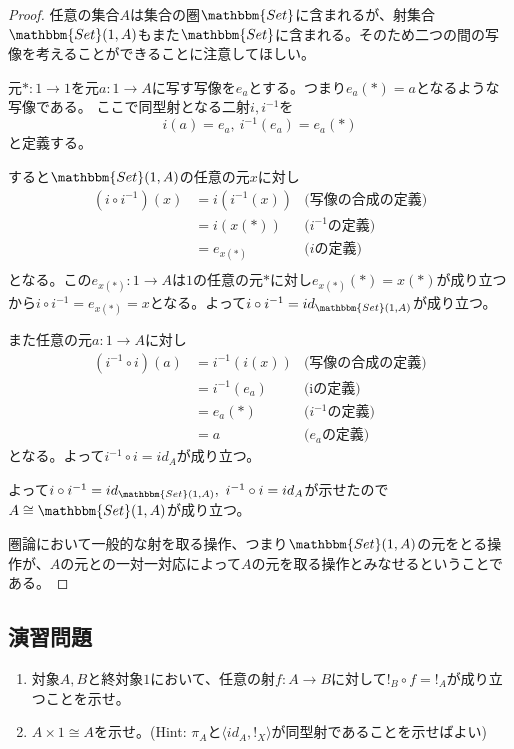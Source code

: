 \documentclass[dvipdfmx]{jsarticle}
\newcommand{\cat}[1]{\mathbbm{#1}}
\newcommand{\arrow}{\rightarrow}
\newcommand{\tuple}[1]{\langle #1\rangle}
\newcommand{\mor}[3]{#1:#2\arrow #3}
\newcommand{\arset}[3]{\cat{#1}(#2,#3)}
\newtheorem{proof}{証明}[section]
\numberwithin{proof}{subsection}
\numberwithin{prop}{subsection}
\numberwithin{define}{subsection}
\begin{document}
	\begin{proof}
		任意の集合$A$は集合の圏$\cat{Set}$に含まれるが、射集合$\arset{Set}{1}{A}$もまた$\cat{Set}$に含まれる。そのため二つの間の写像を考えることができることに注意してほしい。

		元$\mor{*}{1}{1}$を元$\mor{a}{1}{A}$に写す写像を$e_a$とする。つまり$e_a(*)=a$となるような写像である。
		ここで同型射となる二射$i,i^{-1}$を\[i(a)=e_a,\ i^{-1}(e_a)=e_a(*)\]と定義する。
		\begin{center}
		\end{center}
		すると$\arset{Set}{1}{A}$の任意の元$x$に対し
			\begin{align*}
				(i\circ i^{-1})(x)&=i(i^{-1}(x))&\text{(写像の合成の定義)}\\
				&=i(x(*))&\text{($i^{-1}$の定義)}\\
				&=e_{x(*)}&\text{($i$の定義)}\\
			\end{align*}
		となる。この$\mor{e_{x(*)}}{1}{A}$は$1$の任意の元$*$に対し$e_{x(*)}(*)=x(*)$が成り立つから$i\circ i^{-1}=e_{x(*)}=x$となる。よって$i\circ i^{-1}=id_{\arset{Set}{1}{A}}$が成り立つ。

		また任意の元$\mor{a}{1}{A}$に対し
		\begin{align*}
			(i^{-1}\circ i)(a)&=i^{-1}(i(x))&\text{(写像の合成の定義)}\\
			&=i^{-1}(e_a)&\text{(iの定義)}\\
			&=e_a(*)&\text{($i^{-1}$の定義)}\\
			&=a&\text{($e_a$の定義)}
		\end{align*}
		となる。よって$i^{-1}\circ i=id_A$が成り立つ。

		よって$i\circ i^{-1}=id_{\arset{Set}{1}{A}},\ i^{-1}\circ i=id_A$が示せたので$A\cong\arset{Set}{1}{A}$が成り立つ。

		圏論において一般的な射を取る操作、つまり$\arset{Set}{1}{A}$の元をとる操作が、$A$の元との一対一対応によって$A$の元を取る操作とみなせるということである。
	\end{proof}
	\subsection{演習問題}
	\begin{enumerate}
		\item 対象$A,B$と終対象$1$において、任意の射$\mor{f}{A}{B}$に対して$!_B\circ f=!_A$が成り立つことを示せ。
		\item $A\times 1\cong A$を示せ。(Hint: $\pi_A$と$\tuple{id_A,!_X}$が同型射であることを示せばよい)
	\end{enumerate}
\end{document}
